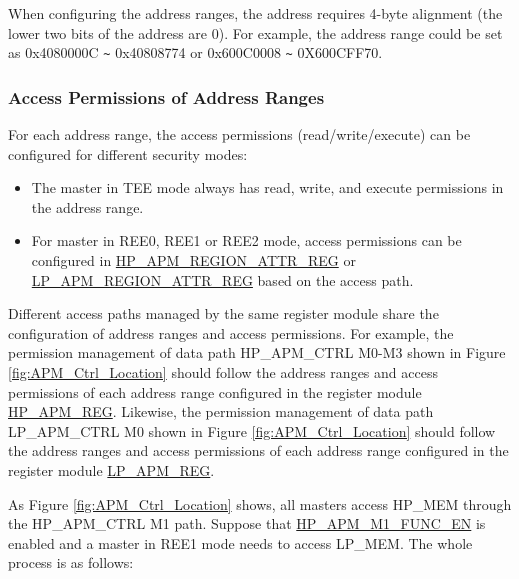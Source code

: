 \documentclass[main\_\_EN.tex]{subfiles}
\begin{document}
When configuring the address ranges, the address requires 4-byte alignment (the lower two bits of the address are 0). For example, the address range could be set as 0x4080000C \verb+~+  0x40808774 or 0x600C0008 \verb+~+ 0X600CFF70.

\subsubsection{Access Permissions of Address Ranges}

For each address range, the access permissions (read/write/execute) can be configured for different security modes:

\begin{itemize}

    \item The master in TEE mode always has read, write, and execute permissions in the address range.

    \item For master in REE0, REE1 or REE2 mode, access permissions can be configured in \hyperref[regdesc:HPAPMREGION0ATTRREG]{HP\_APM\_REGION\_ATTR\_REG} or \hyperref[regdesc:LPAPMREGION0ATTRREG]{LP\_APM\_REGION\_ATTR\_REG} based on the access path.

\end{itemize}

Different access paths managed by the same register module share the configuration of address ranges and access permissions. For example, the permission management of data path HP\_APM\_CTRL M0-M3 shown in Figure \ref{fig:APM_Ctrl_Location} should follow the address ranges and access permissions of each address range configured in the register module \hyperref[sec:permctrl-reg-hp]{HP\_APM\_REG}. Likewise, the permission management of data path LP\_APM\_CTRL M0 shown in Figure \ref{fig:APM_Ctrl_Location} should follow the address ranges and access permissions of each address range configured in the register module \hyperref[sec:permctrl-reg-lp]{LP\_APM\_REG}.

As Figure \ref{fig:APM_Ctrl_Location} shows, all masters access HP\_MEM through the HP\_APM\_CTRL M1 path. Suppose that \hyperref[fielddesc:HPAPMM1FUNCEN]{HP\_APM\_M1\_FUNC\_EN} is enabled and a master in REE1 mode needs to access LP\_MEM. The whole process is as follows:
\end{document}
